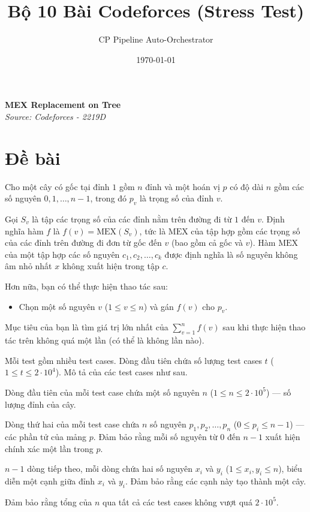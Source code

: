 \documentclass[11pt]{article}
\newcommand{\problem}[2]{
    \begin{problembox}
    \begin{center}
        \Large \textbf{#1} \\
        \vspace{0.2cm}
        \small \textit{Source: #2}
    \end{center}
    \end{problembox}
}
\begin{document}
\title{\textbf{Bộ 10 Bài Codeforces (Stress Test)}}
\author{CP Pipeline Auto-Orchestrator}
\date{\today}
\maketitle
\tableofcontents
\newpage
\problem{MEX Replacement on Tree}{Codeforces - 2219D}

\section*{Đề bài}
Cho một cây có gốc tại đỉnh $1$ gồm $n$ đỉnh và một hoán vị $p$ có độ dài $n$ gồm các số nguyên $0, 1, \ldots, n - 1$, trong đó $p_v$ là trọng số của đỉnh $v$.

Gọi $S_v$ là tập các trọng số của các đỉnh nằm trên đường đi từ $1$ đến $v$. Định nghĩa hàm $f$ là $f(v) = \text{MEX}(S_v)$, tức là $\text{MEX}$ của tập hợp gồm các trọng số của các đỉnh trên đường đi đơn từ gốc đến $v$ (bao gồm cả gốc và $v$). Hàm $\text{MEX}$ của một tập hợp các số nguyên $c_1, c_2, \ldots, c_k$ được định nghĩa là số nguyên không âm nhỏ nhất $x$ không xuất hiện trong tập $c$.

Hơn nữa, bạn có thể thực hiện thao tác sau:
\begin{itemize}
    \item Chọn một số nguyên $v$ ($1 \le v \le n$) và gán $f(v)$ cho $p_v$.
\end{itemize}

Mục tiêu của bạn là tìm giá trị lớn nhất của $\sum_{v = 1}^n f(v)$ sau khi thực hiện thao tác trên không quá một lần (có thể là không lần nào).

\begin{inputbox}
Mỗi test gồm nhiều test cases. Dòng đầu tiên chứa số lượng test cases $t$ ($1 \le t \le 2 \cdot 10^4$). Mô tả của các test cases như sau.

Dòng đầu tiên của mỗi test case chứa một số nguyên $n$ ($1 \le n \le 2 \cdot 10^5$) — số lượng đỉnh của cây.

Dòng thứ hai của mỗi test case chứa $n$ số nguyên $p_1, p_2, \ldots, p_n$ ($0 \le p_i \le n - 1$) — các phần tử của mảng $p$. Đảm bảo rằng mỗi số nguyên từ $0$ đến $n - 1$ xuất hiện chính xác một lần trong $p$.

$n - 1$ dòng tiếp theo, mỗi dòng chứa hai số nguyên $x_i$ và $y_i$ ($1 \le x_i, y_i \le n$), biểu diễn một cạnh giữa đỉnh $x_i$ và $y_i$. Đảm bảo rằng các cạnh này tạo thành một cây.

Đảm bảo rằng tổng của $n$ qua tất cả các test cases không vượt quá $2 \cdot 10^5$.
\end{inputbox}
\end{document}
